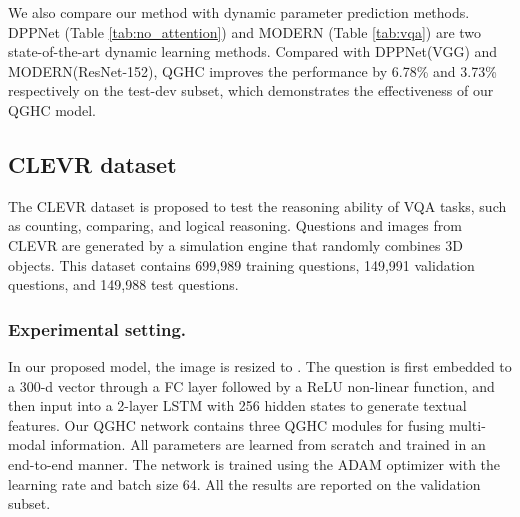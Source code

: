 \documentclass[runningheads]{llncs}
\begin{document}
We also compare our method with dynamic parameter prediction methods. DPPNet \cite{noh2016image} (Table \ref{tab:no_attention}) and MODERN \cite{de2017modulating} (Table \ref{tab:vqa}) are two state-of-the-art dynamic learning methods.
Compared with DPPNet(VGG) and MODERN(ResNet-152), QGHC improves the performance by 6.78\% and 3.73\% respectively on the test-dev subset, which demonstrates the effectiveness of our QGHC model.


\subsection{CLEVR dataset}

The CLEVR dataset \cite{johnson2016clevr} is proposed to test the reasoning ability of VQA tasks, such as counting, comparing, and logical reasoning. Questions and images from CLEVR are generated by a simulation engine that randomly combines 3D objects. This dataset contains 699,989 training questions, 149,991 validation questions, and 149,988 test questions. 


\subsubsection{Experimental setting.}

In our proposed model, the image is resized to . The question is first embedded to a 300-d vector through a FC layer followed by a ReLU non-linear function, and then input into a 2-layer LSTM with 256 hidden states to generate textual features. Our QGHC network contains three QGHC modules for fusing multi-modal information. All parameters are learned from scratch and trained in an end-to-end manner. The network is trained using the ADAM optimizer with the learning rate  and batch size 64. All the results are reported on the validation subset.
\end{document}

